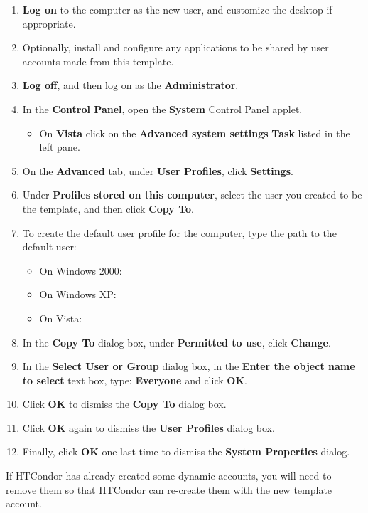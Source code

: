 \begin{enumerate}
\item \textbf{Log on} to the computer as the new user, and customize the
desktop if appropriate. 
\item Optionally, install and configure any applications to be shared
by user accounts made from this template. 
\item \textbf{Log off}, and then log on as the \textbf{Administrator}. 
\item In the \textbf{Control Panel}, open the \textbf{System} Control Panel
 applet. 
 \begin{itemize}
 \item On \textbf{Vista} click on the 
 \textbf{Advanced system settings} \textbf{Task} listed in the left pane.
 \end{itemize} 
\item On the \textbf{Advanced} tab, under \textbf{User Profiles}, 
click \textbf{Settings}. 
\item Under \textbf{Profiles stored on this computer}, select the user
you created to be the template, and then click \textbf{Copy To}. 
\item To create the default user profile for the computer, type the path
to the default user:
 \begin{itemize}
 \item On Windows 2000: \verb@%WinDir%\Profiles\Default@;
 \item On Windows XP: \verb@%SystemDrive%\Documents and Settings\Defualt@;
 \item On Vista: \verb@%SystemDrive%\Users\Default@.
 \end{itemize}
\item In the \textbf{Copy To} dialog box, under \textbf{Permitted to use},
click \textbf{Change}. 
\item In the \textbf{Select User or Group} dialog box, in the 
\textbf{Enter the object name to select} text box, type: \textbf{Everyone}
and click \textbf{OK}.
\item Click \textbf{OK} to dismiss the \textbf{Copy To} dialog box.
\item Click \textbf{OK} again to dismiss the \textbf{User Profiles} dialog box.
\item Finally, click \textbf{OK} one last time to dismiss the
\textbf{System Properties} dialog.
\end{enumerate}

If HTCondor has already created some dynamic accounts, you will need to remove
them so that HTCondor can re-create them with the new template account.

